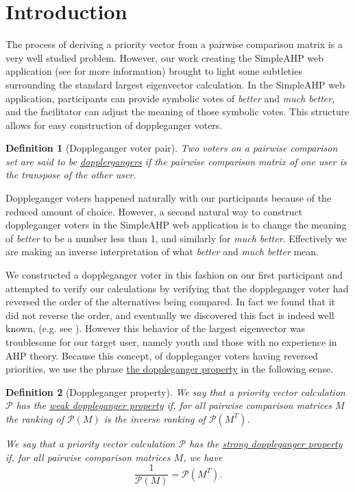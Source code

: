 \documentclass[11pt]{article}
\newtheorem{definition}{Definition}
\begin{document}
\section{Introduction}
The process of deriving a priority vector from a pairwise comparison matrix is a
very well studied problem.  However, our work creating the SimpleAHP web 
application (see \cite{adamsmont} for more information) brought to light some
subtleties surrounding the standard largest eigenvector calculation.
In the SimpleAHP web application, participants can provide symbolic votes
of \emph{better} and \emph{much better}, and the facilitator can adjust the
meaning of those symbolic votes.  This structure allows for easy construction
of doppleganger voters.
\begin{definition}[Doppleganger voter pair]
	Two voters on a pairwise comparison set are said to be \ul{dopplergangers} if
	the pairwise comparison matrix of one user is the transpose of the other user.
\end{definition}
Doppleganger voters happened naturally with our participants because of the
reduced amount of choice.  However, a second natural way to construct doppleganger
voters in the SimpleAHP web application is to change the meaning of \emph{better} 
to be a number less than 1, and similarly for \emph{much better}.  Effectively we
are making an inverse interpretation of what \emph{better} and \emph{much better} 
mean.

We constructed a doppleganger voter in this fashion on our first participant
and attempted to verify our calculations by verifying that the doppleganger voter
had reversed the order of the alternatives being compared.  In fact we found
that it did not reverse the order, and eventually we discovered this fact is
indeed well known, (e.g. see \cite{choo2004common}).  However this behavior
of the largest eigenvector was troublesome for our target user, namely youth
and those with no experience in AHP theory.  Because this concept, of
doppleganger voters having reversed priorities, we use the
phrase \ul{the doppleganger property} in the following sense.
\begin{definition}[Doppleganger property]
	We say that a priority vector calculation $\mathcal{P}$
	has the \ul{weak doppleganger property} if, for
	all pairwise comparison matrices $M$ the ranking of $\mathcal{P}(M)$
	is the inverse ranking of $\mathcal{P}(M^{T})$.
	
	We say that a priority vector calculation $\mathcal{P}$ has
	the \ul{strong doppleganger property} if, for all pairwise comparison
	matrices $M$, we have
	$$\frac{1}{\mathcal{P}(M)} = \mathcal{P}(M^T).$$
\end{definition}
\end{document}
